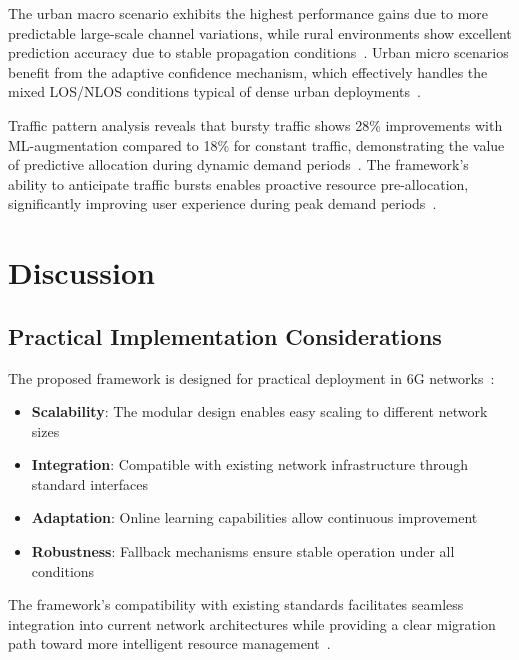 \documentclass[conference]{IEEEtran}
\begin{document}
The urban macro scenario exhibits the highest performance gains due to more predictable large-scale channel variations, while rural environments show excellent prediction accuracy due to stable propagation conditions~\cite{channel_estimation}. Urban micro scenarios benefit from the adaptive confidence mechanism, which effectively handles the mixed LOS/NLOS conditions typical of dense urban deployments~\cite{csi_feedback}.

Traffic pattern analysis reveals that bursty traffic shows 28\% improvements with ML-augmentation compared to 18\% for constant traffic, demonstrating the value of predictive allocation during dynamic demand periods~\cite{adaptive_algorithms}. The framework's ability to anticipate traffic bursts enables proactive resource pre-allocation, significantly improving user experience during peak demand periods~\cite{qos_wireless}.

\section{Discussion}

\subsection{Practical Implementation Considerations}

The proposed framework is designed for practical deployment in 6G networks~\cite{realtime_systems}:

\begin{itemize}
    \item \textbf{Scalability}: The modular design enables easy scaling to different network sizes~\cite{realtime_systems}
    \item \textbf{Integration}: Compatible with existing network infrastructure through standard interfaces~\cite{realtime_systems}
    \item \textbf{Adaptation}: Online learning capabilities allow continuous improvement~\cite{adaptive_algorithms}
    \item \textbf{Robustness}: Fallback mechanisms ensure stable operation under all conditions~\cite{robust_ml}
\end{itemize}

The framework's compatibility with existing standards facilitates seamless integration into current network architectures while providing a clear migration path toward more intelligent resource management~\cite{realtime_systems}.
\end{document}
